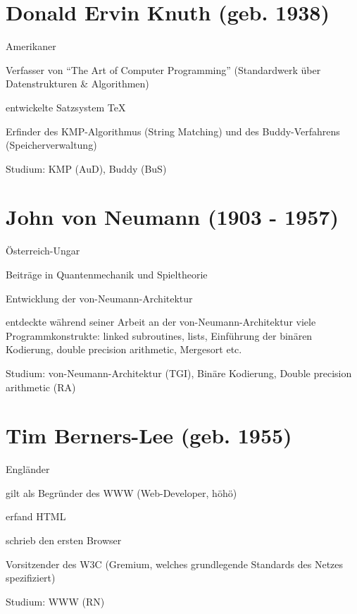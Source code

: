 \documentclass[a4paper,12pt]{report}
\begin{document}
\section*{Donald Ervin Knuth (geb. 1938)}
\begin{itemize*}
	\item Amerikaner
	\item Verfasser von ``The Art of Computer Programming'' (Standardwerk über Datenstrukturen \& Algorithmen)
	\item entwickelte Satzsystem TeX
	\item Erfinder des KMP-Algorithmus (String Matching) und des Buddy-Verfahrens (Speicherverwaltung)
	\item Studium: KMP (AuD), Buddy (BuS)
\end{itemize*}

\section*{John von Neumann (1903 - 1957)}
\begin{itemize*}
	\item Österreich-Ungar
	\item Beiträge in Quantenmechanik und Spieltheorie
	\item Entwicklung der von-Neumann-Architektur
	\item entdeckte während seiner Arbeit an der von-Neumann-Architektur viele Programmkonstrukte: linked subroutines, lists, Einführung der binären Kodierung, double precision arithmetic, Mergesort etc.
	\item Studium: von-Neumann-Architektur (TGI), Binäre Kodierung, Double precision arithmetic (RA)
\end{itemize*}

\section*{Tim Berners-Lee (geb. 1955)}
\begin{itemize*}
	\item Engländer
	\item gilt als Begründer des WWW (Web-Developer, höhö)
	\item erfand HTML
	\item schrieb den ersten Browser
	\item Vorsitzender des W3C (Gremium, welches grundlegende Standards des Netzes spezifiziert)
	\item Studium: WWW (RN)
\end{itemize*}
\end{document}
